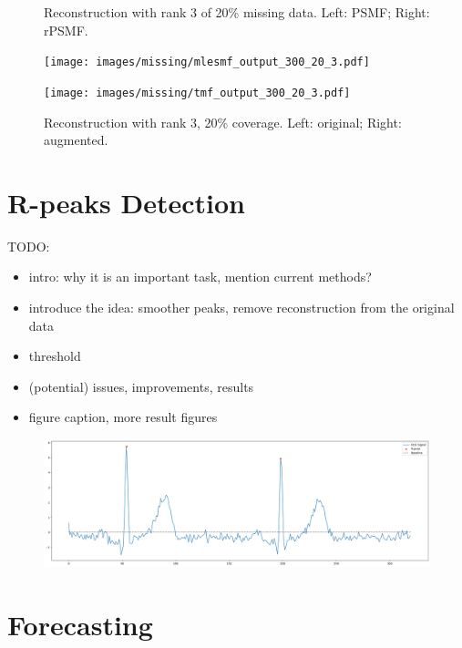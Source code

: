 \documentclass{mldsmsc}
\begin{document}
\begin{figure}[H]
\begin{minipage}{0.4\linewidth}
\end{minipage}
\caption{Reconstruction with rank 3 of 20\% missing data. Left: PSMF; Right: rPSMF.}
\end{figure}

\begin{figure}[H]
\centering
\begin{minipage}{0.4\linewidth}
    \centering
    \texttt{[image: images/missing/mlesmf\_output\_300\_20\_3.pdf]}
    \label{fig:limp}
\end{minipage}%
\hspace{0.05\linewidth}
\begin{minipage}{0.4\linewidth}
    \centering
    \texttt{[image: images/missing/tmf\_output\_300\_20\_3.pdf]}
    \label{fig:augmented}
\end{minipage}
\caption{Reconstruction with rank 3, 20\% coverage. Left: original; Right: augmented.}
\end{figure}

\section{R-peaks Detection}

TODO:
\begin{itemize}
    \item intro: why it is an important task, mention current methods?
    \item introduce the idea: smoother peaks, remove reconstruction from the original data
    \item threshold
    \item (potential) issues, improvements, results
    \item figure caption, more result figures
\end{itemize}

\begin{figure}[H]
\centering
\includegraphics[width=1\linewidth]{images/r_peaks.png}
\label{fig:r-peaks}
\end{figure}

\section{Forecasting}
\end{document}
